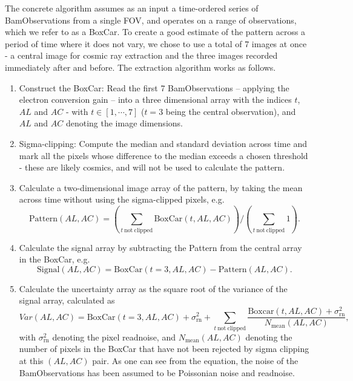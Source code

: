 \documentclass[a4paper, 11pt]{article}
\begin{document}
The concrete algorithm assumes as an input a time-ordered series of BamObservations from a single FOV, and operates on a range of observations, which we refer to as a BoxCar. To create a good estimate of the pattern across a period of time where it does not vary, we chose to use a total of 7 images at once - a central image for cosmic ray extraction and the three images recorded immediately after and before. The extraction algorithm works as follows.

\begin{enumerate}
  \item Construct the BoxCar: Read the first 7 BamObservations -- applying the electron conversion gain -- into a three dimensional array with the indices $t$, $AL$ and $AC$ - with $t \in [1,\cdots,7]$ ($t = 3$ being the central observation), and $AL$ and $AC$ denoting the image dimensions.
  \item Sigma-clipping: Compute the median and standard deviation across time and mark all the pixels whose difference to the median exceeds a chosen threshold - these are likely cosmics, and will not be used to calculate the pattern.
  \item Calculate a two-dimensional image array of the pattern, by taking the mean across time without using the sigma-clipped pixels, e.g.
\begin{equation}
  \mathrm{Pattern}\left( AL,AC \right) = \left( \sum\limits_{t~\mathrm{not~clipped}} \mathrm{BoxCar}\left( t, AL, AC \right) \right) \bigg/ \left( \sum\limits_{t~\mathrm{not~clipped}} 1\right).
\end{equation}
  \item Calculate the signal array by subtracting the Pattern from the central array in the BoxCar, e.g.
\begin{equation}
  \mathrm{Signal}\left( AL,AC \right) = \mathrm{BoxCar}\left(t=3,AL,AC \right) - \mathrm{Pattern}\left( AL,AC \right).
\end{equation}
  \item Calculate the uncertainty array as the square root of the variance of the signal array, calculated as
    \begin{equation}
      Var\left(AL,AC\right) = \mathrm{BoxCar}\left(t=3,AL,AC\right) + \sigma_\mathrm{rn}^2 + \sum\limits_{t~\mathrm{not~clipped}} \frac{\mathrm{Boxcar}\left(t,AL,AC\right) + \sigma_\mathrm{rn}^2}{N_\mathrm{mean}\left(AL,AC\right)},
    \end{equation}
  with $\sigma_\mathrm{rn}^2$ denoting the pixel readnoise, and $N_\mathrm{mean}\left(AL,AC\right)$ denoting the number of pixels in the BoxCar that have not been rejected by sigma clipping at this $\left(AL,AC  \right)$ pair. As one can see from the equation, the noise of the BamObservations has been assumed to be Poissonian noise and readnoise.

\end{enumerate}
\end{document}
